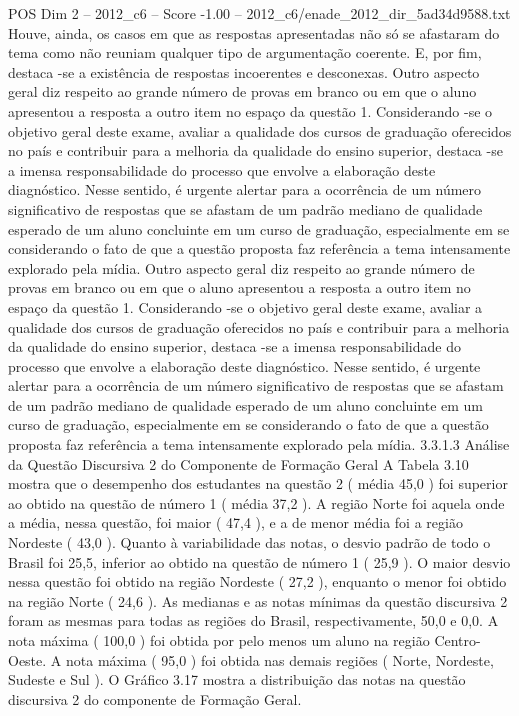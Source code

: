 \begin{textsample}{POS Dim 2 – 2012\_c6 – Score -1.00 – 2012\_c6/enade\_2012\_dir\_5ad34d9588.txt}
Houve, ainda, os casos em que as respostas apresentadas não só se afastaram do tema como não reuniam qualquer tipo de argumentação coerente.
E, por fim, destaca -se a existência de respostas incoerentes e desconexas.
Outro aspecto geral diz respeito ao grande número de provas em branco ou em que o aluno apresentou a resposta a outro item no espaço da questão 1.
Considerando -se o objetivo geral deste exame, avaliar a qualidade dos cursos de graduação oferecidos no país e contribuir para a melhoria da qualidade do ensino superior, destaca -se a imensa responsabilidade do processo que envolve a elaboração deste diagnóstico.
Nesse sentido, é urgente alertar para a ocorrência de um número significativo de respostas que se afastam de um padrão mediano de qualidade esperado de um aluno concluinte em um curso de graduação, especialmente em se considerando o fato de que a questão proposta faz referência a tema intensamente explorado pela mídia.
Outro aspecto geral diz respeito ao grande número de provas em branco ou em que o aluno apresentou a resposta a outro item no espaço da questão 1.
Considerando -se o objetivo geral deste exame, avaliar a qualidade dos cursos de graduação oferecidos no país e contribuir para a melhoria da qualidade do ensino superior, destaca -se a imensa responsabilidade do processo que envolve a elaboração deste diagnóstico.
Nesse sentido, é urgente alertar para a ocorrência de um número significativo de respostas que se afastam de um padrão mediano de qualidade esperado de um aluno concluinte em um curso de graduação, especialmente em se considerando o fato de que a questão proposta faz referência a tema intensamente explorado pela mídia. 3.3.1.3 Análise da Questão Discursiva 2 do Componente de Formação Geral A Tabela 3.10 mostra que o desempenho dos estudantes na questão 2 ( média 45,0 ) foi superior ao obtido na questão de número 1 ( média 37,2 ).
A região Norte foi aquela onde a média, nessa questão, foi maior ( 47,4 ), e a de menor média foi a região Nordeste ( 43,0 ).
Quanto à variabilidade das notas, o desvio padrão de todo o Brasil foi 25,5, inferior ao obtido na questão de número 1 ( 25,9 ).
O maior desvio nessa questão foi obtido na região Nordeste ( 27,2 ), enquanto o menor foi obtido na região Norte ( 24,6 ).
As medianas e as notas mínimas da questão discursiva 2 foram as mesmas para todas as regiões do Brasil, respectivamente, 50,0 e 0,0.
A nota máxima ( 100,0 ) foi obtida por pelo menos um aluno na região Centro-Oeste.
A nota máxima ( 95,0 ) foi obtida nas demais regiões ( Norte, Nordeste, Sudeste e Sul ).
O Gráfico 3.17 mostra a distribuição das notas na questão discursiva 2 do componente de Formação Geral.

\end{textsample}
